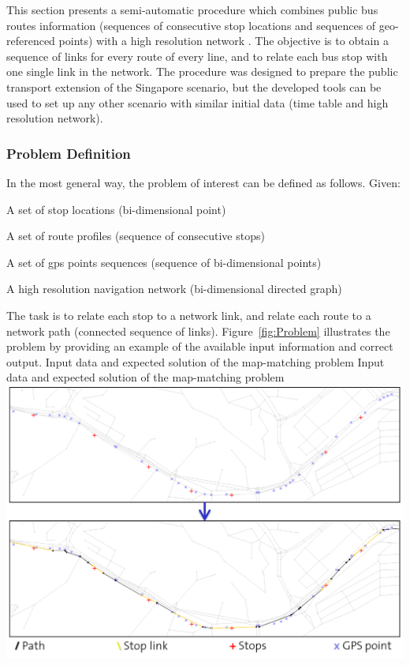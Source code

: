This section presents a semi-automatic procedure which combines public bus routes information (sequences of consecutive stop locations and sequences of geo-referenced points) with a high resolution network \citep[][]{Ordonez_HKSTS_2011}. The objective is to obtain a sequence of links for every route of every line, and to relate each bus stop with one single link in the network. The procedure was designed to prepare the public transport extension of the Singapore scenario, but the developed tools can be used to set up any other scenario with similar initial data (time table and high resolution network).

\subsubsection{Problem Definition}
In the most general way, the problem of interest can be defined as follows. Given:
%
\begin{compactitem}
\item A set of stop locations (bi-dimensional point)
\item A set of route profiles (sequence of consecutive stops)
\item A set of \gls{gps} points sequences (sequence of bi-dimensional points)
\item A high resolution navigation network (bi-dimensional directed graph)
\end{compactitem}
%
The task is to relate each stop to a network link, and relate each route to a network path (connected sequence of links). Figure~\ref{fig:Problem} illustrates the problem by providing an example of the available input information and correct output.
%
\createfigure
{Input data and expected solution of the map-matching problem}
{Input data and expected solution of the map-matching problem}
{\label{fig:Problem}}
{\includegraphics[width=1.0\textwidth]{extending/figures/semiAuto/Problem.png}}
{}


